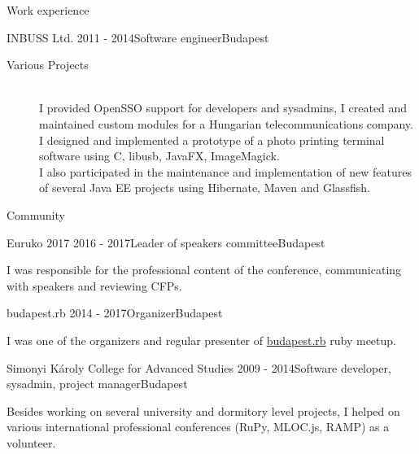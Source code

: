 \documentclass{resume} %
\begin{document}
\begin{rSection}{Work experience}
\begin{rSubsection}{INBUSS Ltd.}
{2011 - 2014}{Software engineer}{Budapest}
  \begin{description}
    \item[Various Projects]\hfill \\
    I provided OpenSSO support for developers and sysadmins, I created and maintained
    custom modules for a Hungarian telecommunications company. \\
    I designed and implemented a prototype of a photo printing terminal software
    using C, libusb, JavaFX, ImageMagick. \\
    I also participated in the maintenance and implementation of new features of
    several Java EE projects using Hibernate, Maven and Glassfish.
  \end{description}
\end{rSubsection}


\end{rSection}


\begin{rSection}{Community}

\begin{rSubsection}{Euruko 2017}
{2016 - 2017}{Leader of speakers committee}{Budapest}
\item I was responsible for the professional content of the conference, communicating
with speakers and reviewing CFPs.
\end{rSubsection}

\begin{rSubsection}{budapest.rb}
{2014 - 2017}{Organizer}{Budapest}
\item I was one of the organizers and regular presenter of
\href{https://www.meetup.com/budapest-rb}{budapest.rb} ruby meetup.
\end{rSubsection}

\begin{rSubsection}{Simonyi Károly College for Advanced Studies}
{2009 - 2014}{Software developer, sysadmin, project manager}{Budapest}
\item Besides working on several university and dormitory level projects, I helped
on various international professional conferences (RuPy, MLOC.js, RAMP) as a volunteer.
\end{rSubsection}

\end{rSection}
\end{document}
